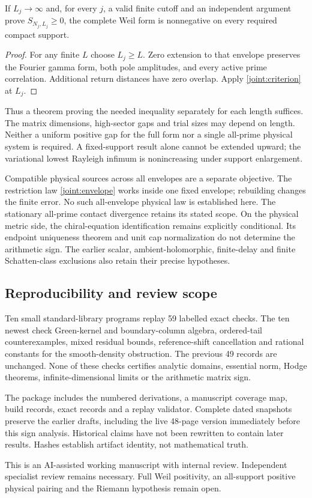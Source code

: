 \begin{proposition}\label{sign:cofinal}
If $L_j\to\infty$ and, for every $j$, a valid finite cutoff and
an independent argument prove $S_{N_j,L_j}\ge0$, the complete
Weil form is nonnegative on every required compact support.
\end{proposition}
\begin{proof}
For any finite $L$ choose $L_j\ge L$. Zero extension to that
 envelope preserves the Fourier gamma form, both pole amplitudes,
and every active prime correlation. Additional return distances
have zero overlap. Apply \eqref{joint:criterion} at $L_j$.
\end{proof}
Thus a theorem proving the needed inequality separately for each
length suffices. The matrix dimensions, high-sector gaps and trial
sizes may depend on length. Neither a uniform positive gap for
 the full form nor a single all-prime physical system is required.
A fixed-support result alone cannot be extended upward; the
variational lowest Rayleigh infimum is nonincreasing under support
 enlargement.

Compatible physical sources across all envelopes are a separate
objective. The restriction law \eqref{joint:envelope} works inside
one fixed envelope; rebuilding changes the finite error. No such
all-envelope physical law is established here. The stationary
all-prime contact divergence retains its stated scope.
On the physical metric side, the chiral-equation identification
remains explicitly conditional. Its endpoint uniqueness theorem
and unit cap normalization do not determine the arithmetic sign.
The earlier scalar, ambient-holomorphic, finite-delay and finite
Schatten-class exclusions also retain their precise hypotheses.

\subsection{Reproducibility and review scope}
Ten small standard-library programs replay 59 labelled exact checks.
The ten newest check Green-kernel and boundary-column algebra,
ordered-tail counterexamples, mixed residual bounds, reference-shift
cancellation and rational constants for the smooth-density obstruction.
The previous 49 records are unchanged. None of these checks
certifies analytic domains, essential norm, Hodge theorems,
infinite-dimensional limits or the arithmetic matrix sign.

The package includes the numbered derivations, a manuscript coverage
map, build records, exact records and a replay validator. Complete
 dated snapshots preserve the earlier drafts, including the live
48-page version immediately before this sign analysis. Historical
claims have not been rewritten to contain later results.
Hashes establish artifact identity, not mathematical truth.

This is an AI-assisted working manuscript with internal review.
Independent specialist review remains necessary. Full Weil
positivity, an all-support positive physical pairing and the
Riemann hypothesis remain open.

